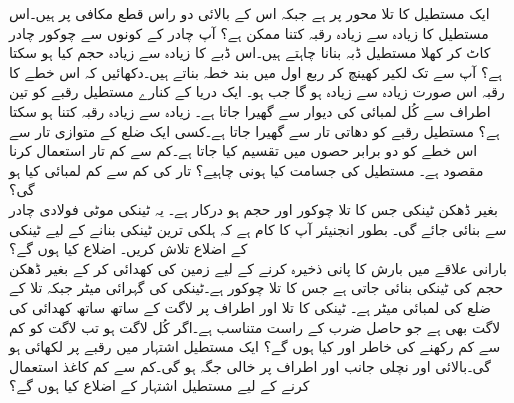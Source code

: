 ایک مستطیل کا تلا محور  پر ہے جبکہ اس کے بالائی دو راس قطع مکافی  پر ہیں۔اس مستطیل کا زیادہ سے زیادہ رقبہ کتنا ممکن ہے؟
آپ   چادر کے کونوں سے چوکور چادر کاٹ کر کھلا مستطیل ڈبہ بنانا چاہتے ہیں۔اس ڈبے کا زیادہ سے زیادہ حجم کیا ہو سکتا ہے؟
آپ  سے  تک لکیر کھینچ کر ربع اول میں بند خطہ بناتے ہیں۔دکھائیں کہ اس خطے کا رقبہ اس صورت زیادہ سے زیادہ ہو گا جب  ہو۔ 
ایک دریا کے کنارے مستطیل رقبے کو تین اطراف سے  کُل لمبائی کی دیوار سے گھیرا جاتا ہے۔ زیادہ سے زیادہ رقبہ کتنا ہو سکتا ہے؟
 مستطیل رقبے کو دھاتی تار سے گھیرا جاتا ہے۔کسی ایک ضلع کے متوازی تار سے اس خطے کو دو برابر حصوں میں تقسیم کیا جاتا ہے۔کم سے کم تار استعمال کرنا مقصود ہے۔ مستطیل کی جسامت کیا ہونی چاہیے؟ تار کی کم سے کم لمبائی کیا ہو گی؟  
\\
بغیر ڈھکن ٹینکی جس کا تلا چوکور اور  حجم  ہو درکار ہے۔ یہ ٹینکی  موٹی فولادی چادر سے بنائی جائے گی۔ بطور انجنیئر آپ کا کام ہے کہ ہلکی ترین ٹینکی بنانے کے لیے ٹینکی کے اضلاع تلاش کریں۔ اضلاع کیا ہوں گے؟
\\
بارانی علاقے میں بارش کا پانی ذخیرہ کرنے کے لیے زمین کی  کھدائی کر کے  بغیر ڈھکن  حجم کی ٹینکی بنائی جاتی ہے جس کا تلا چوکور ہے۔ٹینکی کی گہرائی  میٹر جبکہ تلا کے  ضلع کی لمبائی  میٹر ہے۔ ٹینکی کا تلا اور اطراف پر لاگت کے ساتھ ساتھ کھدائی کی لاگت بھی ہے جو حاصل ضرب  کے راست متناسب ہے۔اگر کُل لاگت   ہو تب لاگت کو کم سے کم رکھنے کی خاطر  اور   کیا  ہوں گے؟ 
ایک مستطیل اشتہار میں  رقبے پر لکھائی ہو گی۔بالائی اور نچلی جانب  اور اطراف پر  خالی جگہ ہو گی۔کم سے کم کاغذ استعمال کرنے کے لیے مستطیل اشتہار کے اضلاع کیا ہوں گے؟ 
